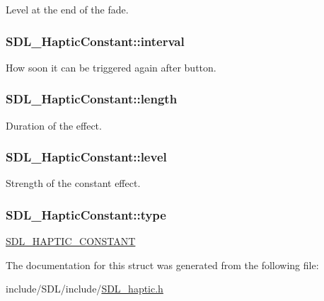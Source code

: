 Level at the end of the fade. \hypertarget{struct_s_d_l___haptic_constant_ab1f7f0df856f4cf1fdf937cb886226b4}{
\subsubsection[{interval}]{ S\-D\-L\-\_\-\-Haptic\-Constant\-::interval}}\label{struct_s_d_l___haptic_constant_ab1f7f0df856f4cf1fdf937cb886226b4}
How soon it can be triggered again after button. \hypertarget{struct_s_d_l___haptic_constant_aeb994c356b1d236b060f277d157e98ec}{
\subsubsection[{length}]{ S\-D\-L\-\_\-\-Haptic\-Constant\-::length}}\label{struct_s_d_l___haptic_constant_aeb994c356b1d236b060f277d157e98ec}
Duration of the effect. \hypertarget{struct_s_d_l___haptic_constant_a5b095eea77464623ed57af15f29f4ca6}{
\subsubsection[{level}]{ S\-D\-L\-\_\-\-Haptic\-Constant\-::level}}\label{struct_s_d_l___haptic_constant_a5b095eea77464623ed57af15f29f4ca6}
Strength of the constant effect. \hypertarget{struct_s_d_l___haptic_constant_a5cb31202803a8bc1be95fcede5ac8afb}{
\subsubsection[{type}]{ S\-D\-L\-\_\-\-Haptic\-Constant\-::type}}\label{struct_s_d_l___haptic_constant_a5cb31202803a8bc1be95fcede5ac8afb}
\hyperlink{_s_d_l__haptic_8h_a955fb9f680dcf9cc72a3d5263e85b80a}{S\-D\-L\-\_\-\-H\-A\-P\-T\-I\-C\-\_\-\-C\-O\-N\-S\-T\-A\-N\-T} 

The documentation for this struct was generated from the following file\-:\begin{DoxyCompactItemize}
\item 
include/\-S\-D\-L/include/\hyperlink{_s_d_l__haptic_8h}{S\-D\-L\-\_\-haptic.\-h}\end{DoxyCompactItemize}
